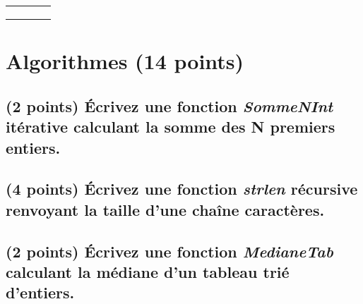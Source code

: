 \documentclass[11pt,a4paper]{article}
\begin{document}
\begin{table}[h!]
\begin{minipage}{0.4\textwidth}
\begin{tabular}{| C{1cm} | C{1cm} | C{1cm} | C{1cm} |}
             &     &     &       \\
        \hline
             &     &     &       \\
             &     &     &       \\
             &     &     &       \\
        \hline
    \end{tabular}
  \end{minipage}
\end{table}


\vfillLast
\newpage

\section{Algorithmes (14 points)}

\subsection{(2 points) \'Ecrivez une fonction \og \textit{SommeNInt} \fg{} itérative calculant la somme des N premiers entiers. }

\bigskip

\begin{center}
\end{center}

\smallskip


\subsection{(4 points) \'Ecrivez une fonction \og \textit{strlen} \fg{} récursive renvoyant la taille d'une chaîne caractères. }

\bigskip

\begin{center}
\end{center}


\newpage

\vfillFirst

\subsection{(2 points) \'Ecrivez une fonction \og \textit{MedianeTab} \fg{} calculant la médiane d'un tableau trié d'entiers. }
\end{document}
